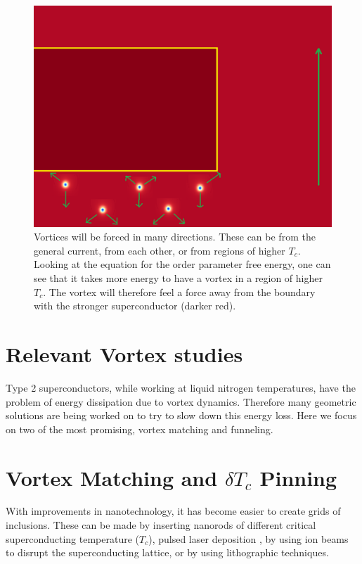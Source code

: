 \begin{figure}[htbp]
\begin{center}
\includegraphics[scale=.50]{forces.png}
\caption{Vortices will be forced in many directions. These can be from the general current, from each other, or from regions of higher $T_c$. Looking at the equation for the order parameter free energy, one can see that it takes more energy to have a vortex in a region of higher $T_c$. The vortex will therefore feel a force away from the boundary with the stronger superconductor (darker red).}
\label{forces}
\end{center}
\end{figure}


\section{Relevant Vortex studies}

Type 2 superconductors, while working at liquid nitrogen temperatures, have the problem of energy dissipation due to vortex dynamics. Therefore many geometric solutions are being worked on to try to slow down this energy loss. Here we focus on two of the most promising, vortex matching and funneling.

\section{Vortex Matching and $\delta T_c$ Pinning}
With improvements in nanotechnology, it has become easier to create grids of inclusions. These can be made by inserting nanorods of different critical superconducting temperature ($T_c$), pulsed laser deposition , by using ion beams to disrupt the superconducting lattice, or by using lithographic techniques.

